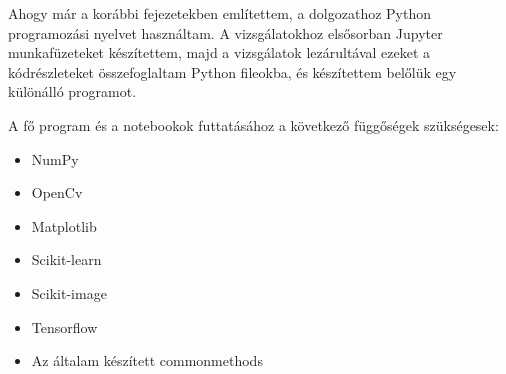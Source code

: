 
Ahogy már a korábbi fejezetekben említettem, a dolgozathoz Python programozási nyelvet használtam. A vizsgálatokhoz elsősorban Jupyter munkafüzeteket készítettem, majd a vizsgálatok lezárultával ezeket a kódrészleteket összefoglaltam Python fileokba, és készítettem belőlük egy különálló programot.

A fő program és a notebookok futtatásához a következő függőségek szükségesek:
\begin{itemize}
\item NumPy
\item OpenCv
\item Matplotlib
\item Scikit-learn
\item Scikit-image
\item Tensorflow
\item Az általam készített commonmethods
\end{itemize}

